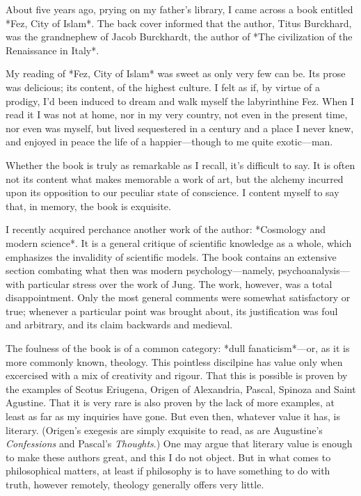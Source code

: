 \documentclass[a4paper, 12pt]{article}
\begin{document}
    
About five years ago, prying on my father's library, I came across a book
entitled *Fez, City of Islam*. The back cover informed that the author, Titus
Burckhard, was the grandnephew of Jacob Burckhardt, the author of *The
civilization of the Renaissance in Italy*. 

My reading of *Fez, City of Islam* was sweet as only very few can be. Its prose
was delicious; its content, of the highest culture. I felt as if, by virtue of
a prodigy, I'd been induced to dream and walk myself the labyrinthine Fez. When
I read it I was not at home, nor in my very country, not even in the
present time, nor even was myself, but lived sequestered in a century and a
place I never knew, and enjoyed in peace the life of a happier—though to me
quite exotic—man.

Whether the book is truly as remarkable as I recall, it's difficult to say. It
is often not its content what makes memorable a work of art, but the alchemy
incurred upon its opposition to our peculiar state of conscience. I content
myself to say that, in memory, the book is exquisite.

I recently acquired perchance another work of the author: *Cosmology and modern
science*. It is a general critique of scientific knowledge as a whole, which
emphasizes the invalidity of scientific models. The book contains an extensive
section combating what then was modern psychology—namely, psychoanalysis—with
particular stress over the work of Jung. The work, however, was a total
disappointment. Only the most general comments were somewhat satisfactory or
true; whenever a particular point was brought about, its justification was foul
and arbitrary, and its claim backwards and medieval.

The foulness of the book is of a common category: *dull fanaticism*—or, as it
is more commonly known, theology. This pointless discilpine has value only when
excercised with a mix of creativity and rigour. That this is possible is proven
by the examples of Scotus Eriugena, Origen of Alexandria, Pascal, Spinoza and
Saint Agustine. That it is very rare is also proven by the lack of more
examples, at least as far as my inquiries have gone. But even then, whatever 
value it has, is literary. (Origen's exegesis are simply exquisite 
to read, as are Augustine's \textit{Confessions} and Pascal's
\textit{Thoughts}.) One may argue that literary value is enough to make these
authors great, and this I do not object. But in what comes to philosophical
matters, at least if philosophy is to have something to do with truth, however
remotely, theology generally offers very little. 
\end{document}
